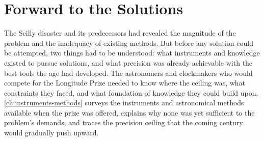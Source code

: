 \section{Forward to the Solutions}
\label{sec:bridge}

The Scilly disaster and its predecessors had revealed the magnitude of the problem and the inadequacy of existing methods. But before any solution could be attempted, two things had to be understood: what instruments and knowledge existed to pursue solutions, and what precision was already achievable with the best tools the age had developed. The astronomers and clockmakers who would compete for the Longitude Prize needed to know where the ceiling was, what constraints they faced, and what foundation of knowledge they could build upon. \cref{ch:instruments-methods} surveys the instruments and astronomical methods available when the prize was offered, explains why none was yet sufficient to the problem's demands, and traces the precision ceiling that the coming century would gradually push upward.
